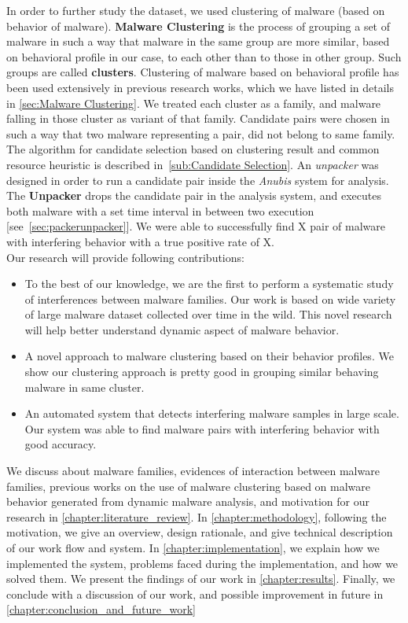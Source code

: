 In order to further study the dataset, we used clustering of malware (based on behavior of malware).
\textbf{Malware Clustering} is the process of grouping a set of malware in such a way that malware in the same group are more similar, based on behavioral profile in our case, to each other than to those in other group.
Such groups are called \textbf{clusters}.
Clustering of malware based on behavioral profile has been used extensively in previous research works, which we have listed in details in \autoref{sec:Malware Clustering}.
We treated each cluster as a family, and malware falling in those cluster as variant of that family.
Candidate pairs were chosen in such a way that two malware representing a pair, did not belong to same family.
The algorithm for candidate selection based on clustering result and common resource heuristic is described in~\autoref{sub:Candidate Selection}.
An \emph{unpacker} was designed in order to run a candidate pair inside the \emph{Anubis} system for analysis.
The \textbf{Unpacker} drops the candidate pair in the analysis system, and executes both malware with a set time interval in between two execution [see~\autoref{sec:packerunpacker}].
We were able to successfully find X pair of malware with interfering behavior with a true positive rate of X.\\

Our research will provide following contributions:
\begin{itemize}
  \item To the best of our knowledge, we are the first to perform a systematic study of interferences between malware families.
    Our work is based on wide variety of large malware dataset collected over time in the wild.
    This novel research will help better understand dynamic aspect of malware behavior.
  \item A novel approach to malware clustering based on their behavior profiles.
    We show our clustering approach is pretty good in grouping similar behaving malware in same cluster.
  \item An automated system that detects interfering malware samples in large scale.
  Our system was able to find malware pairs with interfering behavior with good accuracy.
\end{itemize}
We discuss about malware families, evidences of interaction between malware families, previous works on the use of malware clustering based on malware behavior generated from dynamic malware analysis, and motivation for our research in \autoref{chapter:literature_review}.
In \autoref{chapter:methodology}, following the motivation, we give an overview, design rationale, and give technical description of our work flow and system.
In \autoref{chapter:implementation}, we explain how we implemented the system, problems faced during the implementation, and how we solved them.
We present the findings of our work in \autoref{chapter:results}.
Finally, we conclude with a discussion of our work, and possible improvement in future in \autoref{chapter:conclusion_and_future_work}
